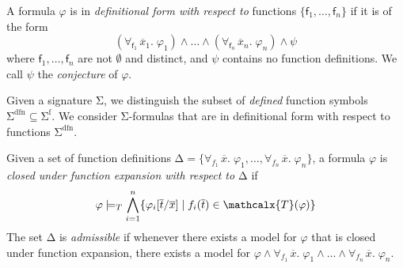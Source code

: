 \documentclass[runningheads,a4paper]{llncs}
\newcommand\DDD{\Delta}
\newcommand{\con}[1]{\mathsf{#1}}
\renewcommand\vec[1]{\overline{#1}}
\let\oldSigma=\Sigma
\def\Sigma{\mathrm{\oldSigma}}
\let\oldDelta=\Delta
\def\Delta{\mathrm{\oldDelta}}
\let\oldwedge=\wedge
\def\wedge{\mathrel{\oldwedge}}
\newcommand{\terms}{\mathcalx{T}}
\newcommand{\sfuns}[1]{#1^\mathrm{f}}
\newcommand{\sfundefs}[1]{#1^\mathrm{dfn}}
\newcommand{\forallf}[1]{\forall_{\!#1\:}}
\newcommand{\fnull}{\emptyset}
\newcommand{\rem}[1]{\textcolor{red}{[#1]}}
\newcommand{\ct}[1]{\rem{#1 --ct}}
\begin{document}
\begin{definition}%
\rm
A formula $\varphi$ is in \emph{definitional form with respect to} functions $\{
\con{f}_1, \ldots, \con{f}_n \}$ if it is of the form
%
%
\begin{equation} \label{eq:wdf}
(\forallf{\con{f}_1} \vec x_1.\; \varphi_1) \wedge \ldots \wedge (\forallf{\con{f}_n} \vec x_n.\; \varphi_n) \wedge \psi
\end{equation}
%
where $\con{f}_1, \ldots, \con{f}_n$ are not $\fnull$ and distinct,
and $\psi$ contains no function definitions.
We call $\psi$ the \emph{conjecture} of $\varphi$.
\end{definition}

Given a signature $\Sigma$,
we distinguish the subset of \emph{defined} function symbols $\sfundefs{\Sigma}
\subseteq \sfuns{\Sigma}$.
We consider $\Sigma$-formulas that are in definitional form with respect to
functions $\sfundefs{\Sigma}$.

\begin{definition}
Given a set of function definitions $\DDD = \{ \forallf{f_1} \vec x.\; \varphi_1, \ldots, \forallf{f_n} \vec x.\; \varphi_n \}$,
a formula $\varphi$ is \emph{closed under function expansion with respect to $\DDD$} if
\begin{eqnarray}
\varphi \models_T \bigwedge_{i=1}^n \{ \varphi_i[ \vec t / \vec x ] \mid f_i( \vec t ) \in \terms( \varphi ) \}
\end{eqnarray}
The set $\DDD$ is \emph{admissible} if whenever there exists a model for $\varphi$ that is closed under function expansion,
there exists a model for $\varphi \wedge \forallf{f_1} \vec x.\; \varphi_1 \wedge \ldots \wedge \forallf{f_n} \vec x.\; \varphi_n$.
\end{definition}
\end{document}
